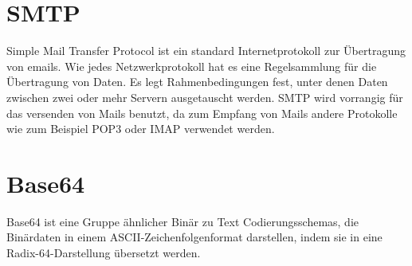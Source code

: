 \section{SMTP}
Simple Mail Transfer Protocol ist ein standard Internetprotokoll zur Übertragung von emails. Wie jedes Netzwerkprotokoll hat es eine Regelsammlung für die Übertragung von Daten. Es legt Rahmenbedingungen fest, unter denen Daten zwischen zwei oder mehr Servern ausgetauscht werden. SMTP wird vorrangig für das versenden von Mails benutzt, da zum Empfang von Mails andere Protokolle wie zum Beispiel POP3 oder IMAP verwendet werden.

\section{Base64}
Base64 ist eine Gruppe ähnlicher Binär zu Text Codierungsschemas, die Binärdaten in einem ASCII-Zeichenfolgenformat darstellen, indem sie in eine Radix-64-Darstellung übersetzt werden.